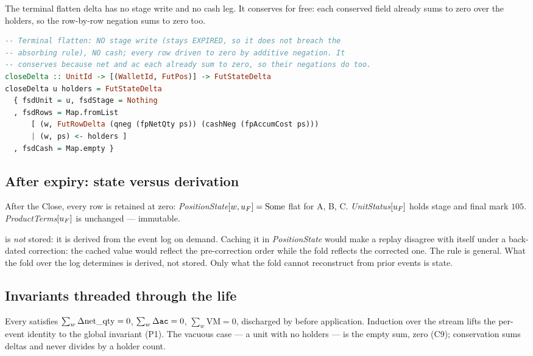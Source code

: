 The terminal flatten delta has no stage write and no cash leg. It conserves for free: each conserved
field already sums to zero over the holders, so the row-by-row negation sums to zero too.

\begin{lstlisting}[language=Haskell]
-- Terminal flatten: NO stage write (stays EXPIRED, so it does not breach the
-- absorbing rule), NO cash; every row driven to zero by additive negation. It
-- conserves because net and ac each already sum to zero, so their negations do too.
closeDelta :: UnitId -> [(WalletId, FutPos)] -> FutStateDelta
closeDelta u holders = FutStateDelta
  { fsdUnit = u, fsdStage = Nothing
  , fsdRows = Map.fromList
      [ (w, FutRowDelta (qneg (fpNetQty ps)) (cashNeg (fpAccumCost ps)))
      | (w, ps) <- holders ]
  , fsdCash = Map.empty }
\end{lstlisting}

\subsection{After expiry: state versus derivation}

After the Close, every row is retained at zero: \emph{PositionState}$[w,u_{F}]=\mathrm{Some}$ flat for
A, B, C. \emph{UnitStatus}$[u_{F}]$ holds stage  and final mark $105$.
\emph{ProductTerms}$[u_{F}]$ is unchanged --- immutable.

 is \emph{not} stored: it is derived from the event log on demand. Caching it
in \emph{PositionState} would make a replay disagree with itself under a back-dated correction: the
cached value would reflect the pre-correction order while the fold reflects the corrected one. The
rule is general. What the fold over the log determines is derived, not stored. Only what the fold
cannot reconstruct from prior events is state.

\subsection{Invariants threaded through the life}
\label{sec:futures-invariants}

\begin{invariant}
Every  satisfies $\sum_w\Delta\mathrm{net\_qty}=0$, $\sum_w\Delta\texttt{ac}=0$, $\sum_w\mathrm{VM}=0$,
discharged by  before application. Induction over the stream lifts the per-event
identity to the global invariant (P1). The vacuous case --- a unit with no holders --- is the empty
sum, zero (C9); conservation sums deltas and never divides by a holder count.
\end{invariant}


